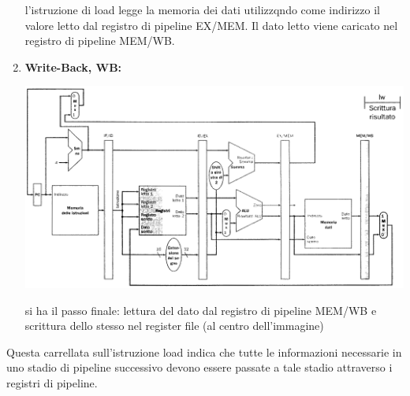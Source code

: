 \documentclass[a4paper,12pt, oneside]{book}
\begin{document}
\begin{enumerate}
  l'istruzione di load legge la memoria dei dati utilizzqndo come
  indirizzo il valore letto dal registro di pipeline
  EX/MEM. Il dato letto viene caricato nel registro di pipeline
  MEM/WB.
  \item \textbf{Write-Back, WB:}
  \begin{center}
    \includegraphics[scale = 0.7]{img/pipe8.png}
  \end{center}
  si ha il passo finale: lettura del dato dal registro di pipeline
  MEM/WB e scrittura dello stesso nel register file (al centro dell'immagine)
\end{enumerate}
Questa carrellata sull'istruzione load indica che tutte le informazioni necessarie
in uno stadio di pipeline successivo devono essere passate a tale
stadio attraverso i registri di pipeline.\\
\end{document}
